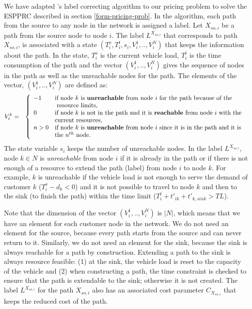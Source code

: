 We have adapted \citet{Feillet}'s label correcting algorithm to our pricing problem to solve the  
ESPPRC described in section \ref{form-pricing-prob}. In the algorithm, each path from the source to any node 
in the network is assigned a 
label. Let $X_{so,i}$ be a path from the source node to node $i$. The label $L^{X_{so,i}}$ 
that corresponds to path $X_{so,i}$, is associated with a state $(T_i^{v},T_i^{t},s_i,V_i^1,..,V_i^N)$  
that keeps the information about the path. In the state,  $T_i^{v}$ is the current vehicle load,
$T_i^{t}$ is the time consumption of the path and the vector $(V_i^1,..,V_i^N)$ gives
the sequence of nodes in the path as well as the unreachable nodes for the path. 
The elements of the vector, $(V_i^1,..,V_i^N)$ are defined as:
\begin{eqnarray*}
V_i^k & = & \left\{ \begin{array}{llll}
                 -1 & \mbox{if node $k$ is {\bf unreachable} from node $i$ for the path because of the}\\
                    & \mbox{ resource limits, }\\
                  0 & \mbox{if node $k$ is not in the path and it is {\bf reachable} from node $i$ with the }\\
                    & \mbox{current resources,}\\
                 n>0 & \mbox{if node $k$ is {\bf unreachable} from node $i$ since it is in the path and it is} \\
		     & \mbox{the $n^{th}$ node.} 
                \end{array} 
              \right. 
\end{eqnarray*}
The state variable $s_i$ keeps the number of unreachable nodes. In the label $L^{X_{so,i}}$,  node $k \in N$ is 
{\em unreachable} from node $i$ if it is already in the path or if there is not 
enough of a resource to extend the path (label) from node $i$ to node $k$. For example, $k$ is unreachable
if the vehicle load is not enough to serve the demand of customer $k$ ($T_i^v-d_k<0$) and it is not possible to 
travel to node $k$ and then to the sink (to finish the path) within the time limit ($T_i^{t}+t'_{ik}+t'_{k,sink}>TL$).   

Note that the dimension of the vector $(V_i^1,..,V_i^N)$ is $|N|$, which means that we have an element for each
customer node in the network. We do not need an element for the source, because every path starts from the source 
and can never return to it. Similarly, we do not need an element for the sink, because the sink is always reachable 
for a path by construction. Extending a path to the sink is always resource feasible: (1) at the sink, the vehicle 
load is reset to the capacity of the vehicle and (2) when constructing a path, the time constraint  
is checked to ensure that the path is extendable to the sink; otherwise it is not created.    
The label $L^{X_{so,i}}$ for the path $X_{so,i}$ also has an associated cost parameter $C_{X_{so,i}}$ that keeps
the reduced cost of the path.   

